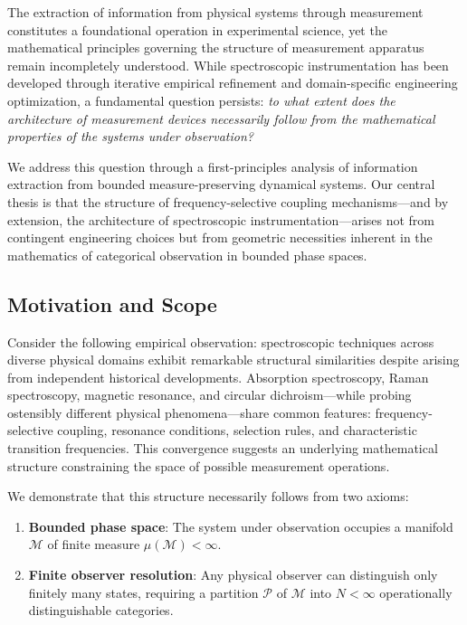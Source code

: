 \documentclass[twocolumn,10pt,a4paper]{article}
\theoremstyle{remark}
\newcommand{\manifold}{\mathcal{M}}
\newcommand{\partition}{\mathcal{P}}
\begin{document}
The extraction of information from physical systems through measurement constitutes a foundational operation in experimental science, yet the mathematical principles governing the structure of measurement apparatus remain incompletely understood. While spectroscopic instrumentation has been developed through iterative empirical refinement and domain-specific engineering optimization, a fundamental question persists: \emph{to what extent does the architecture of measurement devices necessarily follow from the mathematical properties of the systems under observation?} 

We address this question through a first-principles analysis of information extraction from bounded measure-preserving dynamical systems. Our central thesis is that the structure of frequency-selective coupling mechanisms—and by extension, the architecture of spectroscopic instrumentation—arises not from contingent engineering choices but from geometric necessities inherent in the mathematics of categorical observation in bounded phase spaces.

\subsection{Motivation and Scope}

Consider the following empirical observation: spectroscopic techniques across diverse physical domains exhibit remarkable structural similarities despite arising from independent historical developments. Absorption spectroscopy, Raman spectroscopy, magnetic resonance, and circular dichroism—while probing ostensibly different physical phenomena—share common features: frequency-selective coupling, resonance conditions, selection rules, and characteristic transition frequencies. This convergence suggests an underlying mathematical structure constraining the space of possible measurement operations.

We demonstrate that this structure necessarily follows from two axioms:
\begin{enumerate}[label=(\roman*)]
    \item \textbf{Bounded phase space}: The system under observation occupies a manifold $\manifold$ of finite measure $\mu(\manifold) < \infty$.
    \item \textbf{Finite observer resolution}: Any physical observer can distinguish only finitely many states, requiring a partition $\partition$ of $\manifold$ into $N < \infty$ operationally distinguishable categories.
\end{enumerate}
\end{document}
